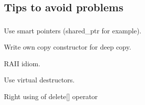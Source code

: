 \documentclass{bredelebeamer}
\begin{document}
\subsection{Tips to avoid problems}
\begin{frame}[fragile]
	\frametitle{}
	\begin{center}
		\begin{exampleblock}{}
			Use smart pointers (shared\_ptr for example).
		\end{exampleblock}
		\begin{exampleblock}{}
			Write own copy constructor for deep copy.
		\end{exampleblock}
		\begin{exampleblock}{}
			RAII idiom.
		\end{exampleblock}
		\begin{exampleblock}{}
			Use virtual destructors.
		\end{exampleblock}
		\begin{exampleblock}{}
		Right using of delete[] operator
		\end{exampleblock}
	\end{center}
\end{frame}
\end{document}
